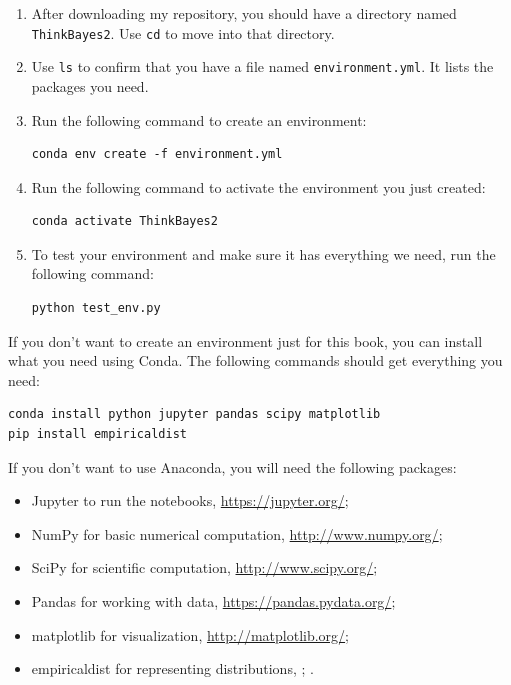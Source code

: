 \documentclass[12pt]{book}
\theoremstyle{exercise}
\begin{document}
\begin{enumerate}

\item After downloading my repository, you should have a directory named {\tt ThinkBayes2}.  Use {\tt cd} to move into that directory.

\item Use {\tt ls} to confirm that you have a file named {\tt environment.yml}.  It lists the packages you need.

\item Run the following command to create an environment:

\begin{verbatim}
conda env create -f environment.yml
\end{verbatim}

\item Run the following command to activate the environment you just created:

\begin{verbatim}
conda activate ThinkBayes2
\end{verbatim}

\item To test your environment and make sure it has everything we need, run the following command:

\begin{verbatim}
python test_env.py
\end{verbatim}

\end{enumerate}

If you don't want to create an environment just for this book, you can install what you need using Conda.
The following commands should get everything you need:

\begin{verbatim}
conda install python jupyter pandas scipy matplotlib
pip install empiricaldist
\end{verbatim}

If you don't want to use Anaconda, you will need the following
packages:

\begin{itemize}

\item Jupyter to run the notebooks, \url{https://jupyter.org/};

\item NumPy for basic numerical computation, \url{http://www.numpy.org/};

\item SciPy for scientific computation, \url{http://www.scipy.org/};

\item Pandas for working with data, \url{https://pandas.pydata.org/};

\item matplotlib for visualization, \url{http://matplotlib.org/};

\item empiricaldist for representing distributions, \url{};
.

\end{itemize}
\end{document}
